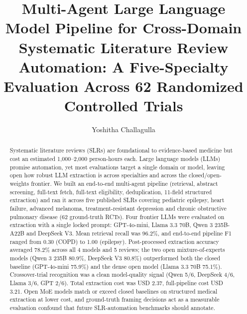 \documentclass[a4paper,fleqn]{cas-sc}
\begin{document}
\let\WriteBookmarks\relax
\def\floatpagepagefraction{1}
\def\textpagefraction{.001}


\title[mode = title]{Multi-Agent Large Language Model Pipeline for
Cross-Domain Systematic Literature Review Automation: A Five-Specialty
Evaluation Across 62 Randomized Controlled Trials}

\author[1]{Yoshitha Challagulla}
\cormark[1]

\begin{abstract}
Systematic literature reviews (SLRs) are foundational to evidence-based
medicine but cost an estimated 1{,}000--2{,}000 person-hours each.
Large language models (LLMs) promise automation, yet most evaluations
target a single domain or model, leaving open how robust LLM extraction is
across specialties and across the closed/open-weights frontier. We built
an end-to-end multi-agent pipeline (retrieval, abstract screening,
full-text fetch, full-text eligibility, deduplication, 11-field structured
extraction) and ran it across five published SLRs covering pediatric
epilepsy, heart failure, advanced melanoma, treatment-resistant depression
and chronic obstructive pulmonary disease (62 ground-truth RCTs).
Four frontier LLMs were evaluated on extraction with a single locked
prompt: GPT-4o-mini, Llama 3.3 70B, Qwen 3 235B-A22B and DeepSeek V3.
Mean retrieval recall was 96.2\%, and end-to-end pipeline F1 ranged
from 0.30 (COPD) to 1.00 (epilepsy). Post-processed extraction accuracy
averaged 78.2\% across all 4 models and 5 reviews; the two open
mixture-of-experts models (Qwen 3 235B 80.9\%, DeepSeek V3 80.8\%)
outperformed both the closed baseline (GPT-4o-mini 75.9\%) and the dense
open model (Llama 3.3 70B 75.1\%). Crossover-trial recognition was a
clean model-quality signal (Qwen 5/6, DeepSeek 4/6, Llama 3/6, GPT 2/6).
Total extraction cost was USD 2.37, full-pipeline cost USD 3.21. Open
MoE models match or exceed closed baselines on structured medical
extraction at lower cost, and ground-truth framing decisions act as a
measurable evaluation confound that future SLR-automation benchmarks
should annotate.
\end{abstract}
\end{document}
